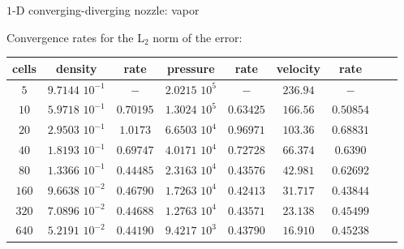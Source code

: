 \documentclass[xcolor=dvipsnames,10pt]{beamer}
\begin{document}
\begin{frame}{$1$-D converging-diverging nozzle: vapor}
\begin{center}
Convergence rates for the L$_2$ norm of the error:
\end{center}
\begin{table}[H]
\begin{center}
 \begin{tabular}{|c|c|c|c|c|c|c|c|c|}
 \hline
cells & density             & rate      & pressure          & rate      & velocity & rate       \\ \hline
$5$   & $9.7144$ $10^{-1}$  & $-$       & $2.0215$ $10^{5}$ & $-$       & $236.94$ & $-$        \\ \hline
$10$  & $5.9718$ $10^{-1}$  & $0.70195$ & $1.3024$ $10^{5}$ & $0.63425$ & $166.56$ & $0.50854$  \\ \hline
$20$  & $2.9503$ $10^{-1}$  & $1.0173$  & $6.6503$ $10^{4}$ & $0.96971$ & $103.36$ & $0.68831$  \\ \hline
$40$  & $1.8193$ $10^{-1}$  & $0.69747$ & $4.0171$ $10^{4}$ & $0.72728$ & $66.374$ & $0.6390$   \\ \hline
$80$  & $1.3366$ $10^{-1}$  & $0.44485$ & $2.3163$ $10^{4}$ & $0.43576$ & $42.981$ & $0.62692$  \\ \hline
$160$ & $9.6638$ $10^{-2}$  & $0.46790$ & $1.7263$ $10^{4}$ & $0.42413$ & $31.717$ & $0.43844$  \\ \hline
$320$ & $7.0896$ $10^{-2}$  & $0.44688$ & $1.2763$ $10^{4}$ & $0.43571$ & $23.138$ & $0.45499$  \\ \hline
$640$ & $5.2191$ $10^{-2}$  & $0.44190$ & $9.4217$ $10^{3}$ & $0.43790$ & $16.910$ & $0.45238$  \\ \hline
\end{tabular}
\end{center}
\nonumber
\end{table}
\end{frame}
\end{document}
